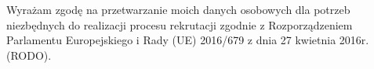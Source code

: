 \documentclass[a4paper]{article}
\begin{document}
\vfill
\begin{center}
\tiny Wyrażam zgodę na przetwarzanie moich danych osobowych dla potrzeb niezbędnych do realizacji procesu rekrutacji zgodnie z Rozporządzeniem Parlamentu Europejskiego i Rady (UE) 2016/679 z dnia 27 kwietnia 2016r. (RODO).
\end{center}
\end{document}
